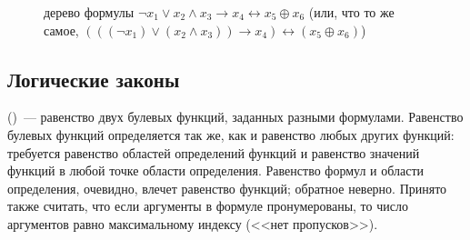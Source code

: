 \begin{figure}[ht!]
\center
{}
\caption{дерево формулы $ \neg x_1 \vee x_2 \wedge x_3 \rightarrow x_4 \leftrightarrow x_5 \oplus x_6 $
(или, что то же самое, $ (((\neg x_1) \vee (x_2 \wedge x_3)) \rightarrow x_4) \leftrightarrow (x_5 \oplus x_6) $)}
\label{fig:boolean:tree_example}
\end{figure}

\FloatBarrier



\subsection{Логические законы}
\label{subsec:boolean:laws}



 ()~--- равенство двух булевых функций, заданных разными формулами.
Равенство булевых функций определяется так же, как и равенство любых других функций:
требуется равенство областей определений функций и равенство значений функций в любой точке области определения.
Равенство формул и области определения, очевидно, влечет равенство функций; обратное неверно.
Принято также считать, что если аргументы в формуле пронумерованы, то число аргументов равно максимальному индексу (<<нет пропусков>>).

